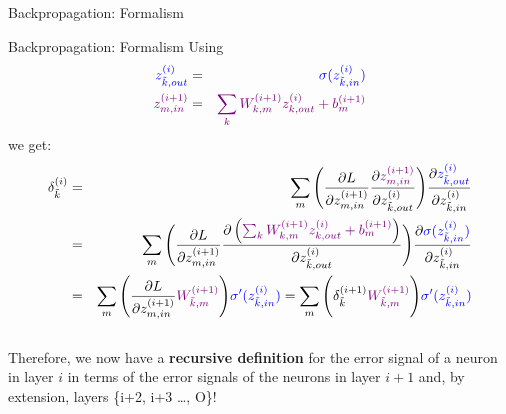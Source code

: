 \begin{vbframe} {Backpropagation: Formalism}
\end{vbframe}

\begin{frame} {Backpropagation: Formalism}
 Using 
 \vspace*{-5mm}
        {\footnotesize \begin{eqnarray*}
          \textcolor{blue}{z_{\tilde{k},out}^{(i)}} &=& \textcolor{blue}{\sigma(z_{\tilde{k},in}^{(i)})} \\
          \textcolor{violet}{z_{m,in}^{(i+1)}} &=& \textcolor{violet}{\sum_k W_{k,m}^{(i+1)}z_{k,out}^{(i)} + b_m^{(i+1)}}
        \end{eqnarray*}}
we get: 
      \vspace{-0.2cm}
      {\footnotesize \begin{eqnarray*}
      \delta_{\tilde{k}}^{(i)} &=& \sum_m \Bigg( \frac{\partial L}{\partial z_{m,in}^{(i+1)}} \frac{\partial \textcolor{violet}{z_{m,in}^{(i+1)}}}{\partial z_{\tilde{k},out}^{(i)}} \Bigg) \frac{\partial \textcolor{blue}{z_{\tilde{k},out}^{(i)}}}{\partial z_{\tilde{k},in}^{(i)}}  \\
       &=& \sum_m \Bigg( \frac{\partial L}{\partial z_{m,in}^{(i+1)}} \frac{\partial \left(\textcolor{violet}{\sum_k W_{k,m}^{(i+1)}z_{k,out}^{(i)} + b_m^{(i+1)}}\right)}{\partial z_{\tilde{k},out}^{(i)}} \Bigg) \frac{\partial \textcolor{blue}{\sigma(z_{\tilde{k},in}^{(i)})}}{\partial z_{\tilde{k},in}^{(i)}}  \\
      &=& \sum_m \Bigg( \frac{\partial L}{\partial z_{m,in}^{(i+1)}} \textcolor{violet}{W_{\tilde{k},m}^{(i+1)}} \Bigg) \textcolor{blue}{\sigma'(z_{\tilde{k},in}^{(i)})} = \sum_m \Bigg(  \delta_{\tilde{k}}^{(i+1)} \textcolor{violet}{W_{\tilde{k},m}^{(i+1)}} \Bigg) \textcolor{blue}{\sigma'(z_{\tilde{k},in}^{(i)})} 
      \end{eqnarray*}}\\
      Therefore, we now have a \textbf{recursive definition} for the error signal of a neuron in layer $i$ in terms of the error signals of the neurons in layer $i+1$ and, by extension, layers \{i+2, i+3 \ldots , O\}!
\end{frame}

